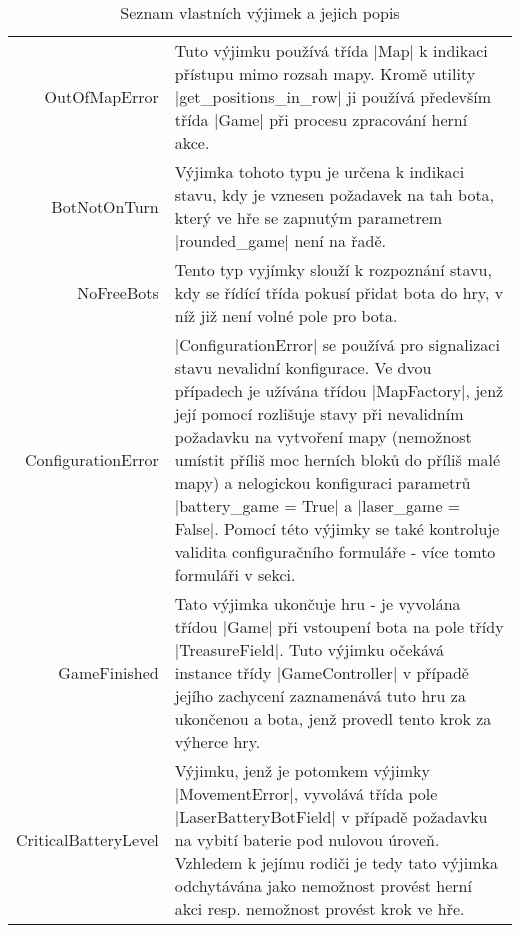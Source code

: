 \begin{table}
	\renewcommand{\arraystretch}{1.2}
	\centering
	
	\begin{tabular}{ B || p{.6\textwidth} }
		OutOfMapError & Tuto výjimku používá třída \ic|Map| k indikaci přístupu mimo rozsah mapy. Kromě utility \ic|get_positions_in_row| ji používá především třída \ic|Game| při procesu zpracování herní akce. \\

		BotNotOnTurn & Výjimka tohoto typu je určena k indikaci stavu, kdy je vznesen požadavek na tah bota, který ve hře se zapnutým parametrem \ic|rounded_game| není na řadě. \\

		NoFreeBots & Tento typ vyjímky slouží k rozpoznání stavu, kdy se řídící třída pokusí přidat bota do hry, v níž již není volné pole pro bota. \\

		ConfigurationError & \ic|ConfigurationError| se používá pro signalizaci stavu nevalidní konfigurace. Ve dvou případech je užívána třídou \ic|MapFactory|, jenž její pomocí rozlišuje stavy při nevalidním požadavku na vytvoření mapy (nemožnost umístit příliš moc herních bloků do příliš malé mapy) a nelogickou konfiguraci parametrů \ic|battery_game = True| a \ic|laser_game = False|. Pomocí této výjimky se také kontroluje validita configuračního formuláře - více tomto formuláři v sekci. \\

		GameFinished & Tato výjimka ukončuje hru - je vyvolána třídou \ic|Game| při vstoupení bota na pole třídy \ic|TreasureField|. Tuto výjimku očekává instance třídy \ic|GameController| v případě jejího zachycení zaznamenává tuto hru za ukončenou a bota, jenž provedl tento krok za výherce hry. \\

		CriticalBatteryLevel & Výjimku, jenž je potomkem výjimky \ic|MovementError|, vyvolává třída pole \ic|LaserBatteryBotField| v případě požadavku na vybití baterie pod nulovou úroveň. Vzhledem k jejímu rodiči je tedy tato výjimka odchytávána jako nemožnost provést herní akci resp. nemožnost provést krok ve hře. \\
	\end{tabular}
	\caption{Seznam vlastních výjimek a jejich popis}
	\label{table:custom-exceptions}
\end{table}

